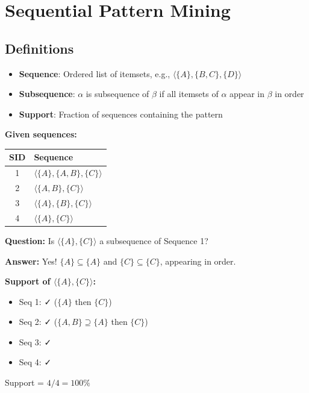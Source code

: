 \section{Sequential Pattern Mining}

\subsection{Definitions}

\begin{definitionbox}
\begin{itemize}
    \item \textbf{Sequence}: Ordered list of itemsets, e.g., $\langle \{A\}, \{B,C\}, \{D\} \rangle$
    \item \textbf{Subsequence}: $\alpha$ is subsequence of $\beta$ if all itemsets of $\alpha$ appear in $\beta$ in order
    \item \textbf{Support}: Fraction of sequences containing the pattern
\end{itemize}
\end{definitionbox}

\begin{examplebox}
\textbf{Given sequences:}
\begin{center}
\begin{tabular}{cl}
\toprule
\textbf{SID} & \textbf{Sequence} \\
\midrule
1 & $\langle \{A\}, \{A,B\}, \{C\} \rangle$ \\
2 & $\langle \{A,B\}, \{C\} \rangle$ \\
3 & $\langle \{A\}, \{B\}, \{C\} \rangle$ \\
4 & $\langle \{A\}, \{C\} \rangle$ \\
\bottomrule
\end{tabular}
\end{center}

\textbf{Question:} Is $\langle \{A\}, \{C\} \rangle$ a subsequence of Sequence 1?

\textbf{Answer:} Yes! $\{A\} \subseteq \{A\}$ and $\{C\} \subseteq \{C\}$, appearing in order.

\textbf{Support of $\langle \{A\}, \{C\} \rangle$:}
\begin{itemize}
    \item Seq 1: ✓ ($\{A\}$ then $\{C\}$)
    \item Seq 2: ✓ ($\{A,B\} \supseteq \{A\}$ then $\{C\}$)
    \item Seq 3: ✓
    \item Seq 4: ✓
\end{itemize}
Support = $4/4 = 100\%$
\end{examplebox}

